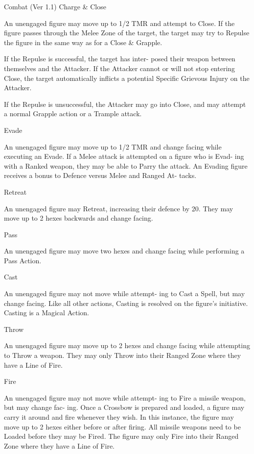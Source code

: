 \begin{Chapter}{Combat (Ver 1.1)}
Charge \& Close 

An  unengaged  figure  may  move  up  to  1/2  TMR 
and  attempt  to  Close.  If  the  figure  passes  through 
the Melee Zone of the target, the target may try to 
Repulse  the  figure  in the  same  way  as  for  a Close 
\& Grapple. 

If  the  Repulse  is  successful,  the  target  has  inter-
posed  their  weapon  between  themselves  and  the 
Attacker.  If  the  Attacker  cannot  or  will  not  stop 
entering  Close,  the  target  automatically  inflicts  a 
potential Specific Grievous Injury on the Attacker. 

If the Repulse is unsuccessful, the Attacker may go 
into  Close,  and  may  attempt  a  normal  Grapple 
action or a Trample attack. 

Evade 

An  unengaged  figure  may  move  up  to  1/2  TMR 
and  change  facing  while  executing  an  Evade.  If  a 
Melee attack is attempted on a figure who is Evad-
ing  with  a  Ranked  weapon,  they  may  be  able  to 
Parry  the  attack.  An  Evading  figure  receives  a 
bonus  to  Defence  versus  Melee  and  Ranged  At-
tacks. 

Retreat 

An unengaged figure may Retreat, increasing their 
defence  by  20.  They  may  move  up  to  2  hexes 
backwards and change facing. 

Pass 

An  unengaged  figure  may  move  two  hexes  and 
change facing while performing a Pass Action. 

Cast 

An unengaged figure may not move while attempt-
ing to Cast a Spell, but may change facing. Like all 
other  actions,  Casting  is  resolved  on  the  figure’s 
initiative. Casting is a Magical Action. 

Throw 

An unengaged figure may move up to 2 hexes and 
change  facing  while  attempting 
to  Throw  a 
weapon.  They  may  only  Throw  into  their  Ranged 
Zone where they have a Line of Fire. 

Fire 

An unengaged figure may not move while attempt-
ing to Fire a missile weapon, but may change fac-
ing.  Once  a  Crossbow  is  prepared  and  loaded,  a 
figure  may  carry  it  around  and  fire whenever  they 
wish. In this instance, the figure may move up to 2 
hexes  either  before  or  after  firing.  All  missile 
weapons  need  to  be  Loaded  before  they  may  be 
Fired.  The  figure  may  only  Fire  into  their  Ranged 
Zone where they have a Line of Fire. 


\end{Chapter}
